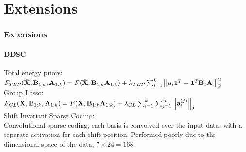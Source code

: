 \documentclass[gray]{beamer}
\begin{document}
\section{Extensions}
\begin{frame}
\frametitle{Extensions}
\framesubtitle{DDSC}
Total energy priors: \\
\vspace{0.1in}
$F_{TEP}(\bar{\mathbf{X}},\mathbf{B}_{1:k},\mathbf{A}_{1:k}) = F(\bar{\mathbf{X}},\mathbf{B}_{1:k} \mathbf{A}_{1:k}) + \lambda_{TEP}\sum_{i=1}^k \left\lVert\mu_i\mathbf{1}^T-\mathbf{1}^T\mathbf{B}_i\mathbf{A}_i\right\rVert^2_2$ \\
\vspace{0.1in}
Group Lasso: \\
\vspace{0.1in}
$F_{GL}(\bar{\mathbf{X}},\mathbf{B}_{1:k},\mathbf{A}_{1:k}) = F(\bar{\mathbf{X}},\mathbf{B}_{1:k} \mathbf{A}_{1:k}) + \lambda_{GL}\sum_{i=1}^k \sum_{j=1}^m \left\lVert\mathbf{a}_i^{(j)}\right\rVert_2$ \\
\vspace{0.1in}
Shift Invariant Sparse Coding: \\
\vspace{0.1in}
Convolutional sparse coding; each basis is convolved over the input data, with a separate activation for each shift position. Performed poorly due to the dimensional space of the data, $7 \times 24 = 168$.
\end{frame}

\end{document}
